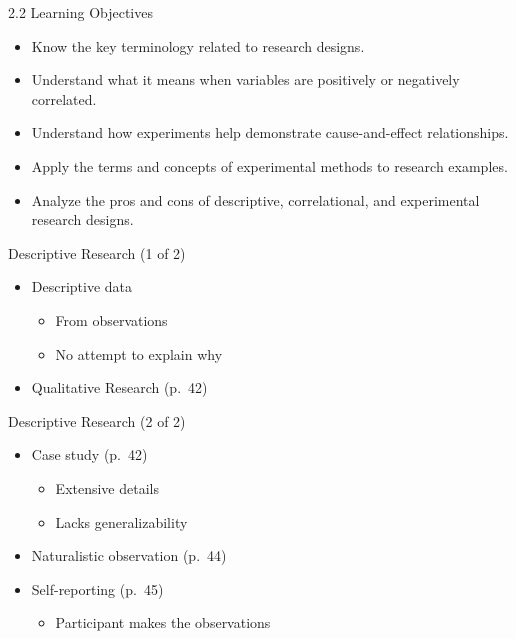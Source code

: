 \documentclass[
]{book}
\providecommand{\tightlist}{%
  \setlength{\itemsep}{0pt}\setlength{\parskip}{0pt}}
\begin{document}
2.2 Learning Objectives

\begin{itemize}
\tightlist
\item
  Know the key terminology related to research designs.\\
\item
  Understand what it means when variables are positively or negatively correlated.\\
\item
  Understand how experiments help demonstrate cause-and-effect relationships.\\
\item
  Apply the terms and concepts of experimental methods to research examples.\\
\item
  Analyze the pros and cons of descriptive, correlational, and experimental research designs.
\end{itemize}

Descriptive Research (1 of 2)

\begin{itemize}
\tightlist
\item
  Descriptive data

  \begin{itemize}
  \tightlist
  \item
    From observations\\
  \item
    No attempt to explain why\\
  \end{itemize}
\item
  Qualitative Research (p.~42)
\end{itemize}

Descriptive Research (2 of 2)

\begin{itemize}
\tightlist
\item
  Case study (p.~42)

  \begin{itemize}
  \tightlist
  \item
    Extensive details\\
  \item
    Lacks generalizability\\
  \end{itemize}
\item
  Naturalistic observation (p.~44)\\
\item
  Self-reporting (p.~45)

  \begin{itemize}
  \tightlist
  \item
    Participant makes the observations
  \end{itemize}
\end{itemize}
\end{document}
